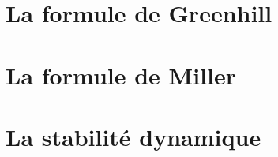     \chapter{La formule de Greenhill}
    \label{chap:formule_greenhill}
    

    \chapter{La formule de Miller}
    \label{chap:formule_miller}
    

    \chapter{La stabilité dynamique}
    \label{chap:stabilite_dynamique}
    


